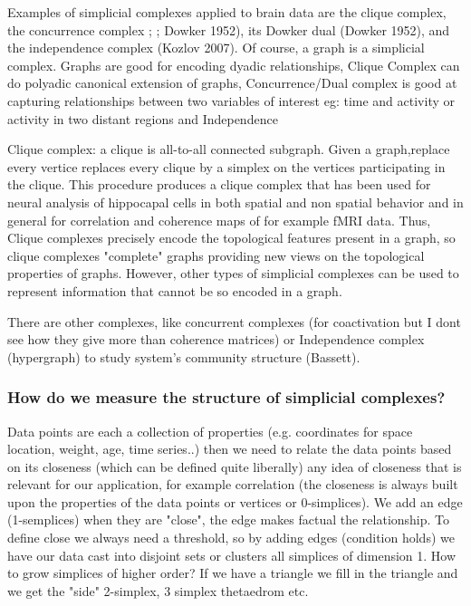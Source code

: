 \documentclass[onecollarge,runningheads]{svjour2}
\begin{document}
Examples of simplicial complexes applied to brain data are the clique complex, the concurrence complex \citep{ellis2012describing}; \citep{curto2008cell}; Dowker 1952), its Dowker dual (Dowker 1952), and the independence complex (Kozlov 2007).
Of course, a graph is a simplicial complex. Graphs are good for encoding dyadic relationships, Clique Complex can do polyadic canonical extension of graphs, Concurrence/Dual complex is good at capturing relationships between two variables of interest eg: time and activity or activity in two distant regions and  Independence 

Clique complex:  a clique is all-to-all connected subgraph. Given a graph,replace every vertice replaces every clique by a simplex on the vertices participating in the clique. This procedure produces a clique complex that has been used for neural analysis of hippocapal cells in both spatial and non spatial behavior \citep{giusti2015clique} and in general for correlation and coherence maps of for example fMRI data.
Thus, Clique complexes precisely encode the topological features present in a graph, so clique complexes "complete" graphs providing new views on the topological properties of graphs.
However, other types of simplicial complexes can be used to represent information that cannot be so encoded in a graph.

There are other complexes, like concurrent complexes (for coactivation but I dont see how they give more than coherence matrices) or Independence complex (hypergraph) to study system’s community structure (Bassett).


\subsubsection{How do we measure the structure of simplicial complexes?}
Data points are each a collection of properties (e.g. coordinates for space location, weight, age, time series..) then we need to relate the data points based on its closeness (which can be defined quite liberally) any idea of closeness that is relevant for our application, for example correlation (the closeness is always built upon the properties of the data points or vertices or 0-simplices). We add an edge (1-semplices) when they are "close", the edge makes factual the relationship. To define close we always need a threshold, so by adding edges (condition holds) we have our data cast into disjoint sets or clusters all simplices of dimension 1.
How to grow simplices of higher order? If we have a triangle we fill in the triangle and we get the "side" 2-simplex, 3 simplex thetaedrom etc.
\end{document}
